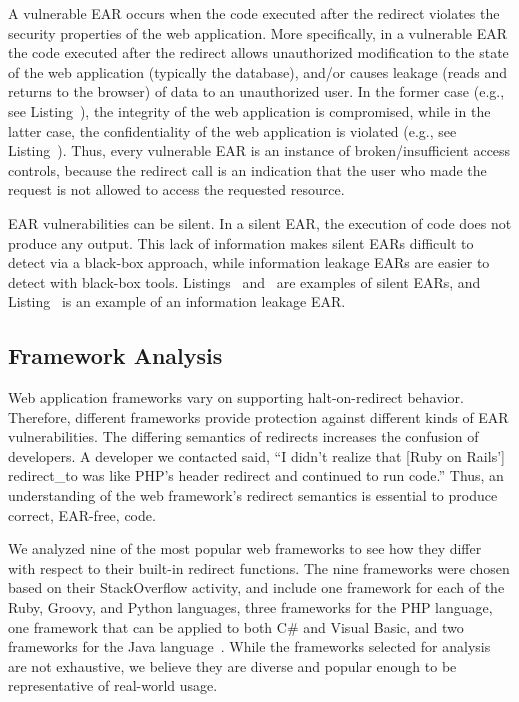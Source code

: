 A vulnerable EAR occurs when the code executed after the redirect violates
the security properties of the web application. More specifically, in a
vulnerable EAR the code executed after the redirect allows unauthorized
modification to the state of the web application (typically the database),
and/or causes leakage (reads and returns to the browser) of data to an
unauthorized user. In the former case (e.g., see
Listing~), the integrity of the web application is
compromised, while in the latter case, the confidentiality of the web
application is violated (e.g., see Listing~). Thus,
every vulnerable EAR is an instance of broken/insufficient access controls,
because the redirect call is an indication that the user who made the
request is not allowed to access the requested resource.



EAR vulnerabilities can be silent. In a silent EAR, the execution of code
does not produce any output. This lack of information makes silent EARs
difficult to detect via a black-box approach, while information leakage
EARs are easier to detect with black-box tools.
Listings~ and~ are examples of
silent EARs, and Listing~ is an example of an
information leakage EAR.

\subsection{Framework Analysis}
Web application frameworks vary on supporting halt-on-redirect
behavior. Therefore, different frameworks provide protection against
different kinds of EAR vulnerabilities. The differing semantics of
redirects increases the confusion of developers. A developer we
contacted said, ``I didn't realize that [Ruby on
  Rails'] redirect\_to was like PHP's header redirect and continued to
run code.'' Thus, an understanding of the web framework's redirect
semantics is essential to produce correct, EAR-free, code.

We analyzed nine of the most popular web frameworks to see how they differ
with respect to their built-in redirect functions. The nine frameworks were
chosen based on their StackOverflow activity, and include one framework for
each of the Ruby, Groovy, and Python languages, three frameworks for the
PHP language, one framework that can be applied to both C\# and Visual
Basic, and two frameworks for the Java language~\cite{boe11:frameworks}. While
the frameworks selected for analysis are not exhaustive, we believe they
are diverse and popular enough to be representative of real-world usage.

